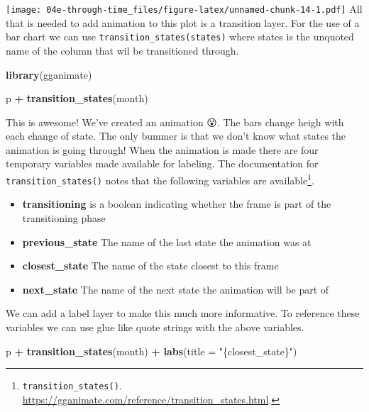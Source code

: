 \documentclass[
]{book}
\newenvironment{Shaded}{\begin{snugshade}}{\end{snugshade}}
\newcommand{\DataTypeTok}[1]{\textcolor[rgb]{0.13,0.29,0.53}{#1}}
\newcommand{\KeywordTok}[1]{\textcolor[rgb]{0.13,0.29,0.53}{\textbf{#1}}}
\newcommand{\NormalTok}[1]{#1}
\newcommand{\OperatorTok}[1]{\textcolor[rgb]{0.81,0.36,0.00}{\textbf{#1}}}
\newcommand{\StringTok}[1]{\textcolor[rgb]{0.31,0.60,0.02}{#1}}
\providecommand{\tightlist}{%
  \setlength{\itemsep}{0pt}\setlength{\parskip}{0pt}}
\begin{document}
\texttt{[image: 04e-through-time\_files/figure-latex/unnamed-chunk-14-1.pdf]}
All that is needed to add animation to this plot is a transition layer. For the use of a bar chart we can use \texttt{transition\_states(states)} where states is the unquoted name of the column that wil be transitioned through.

\begin{Shaded}
\begin{Highlighting}[]
\KeywordTok{library}\NormalTok{(gganimate)}

\NormalTok{p }\OperatorTok{+}\StringTok{ }\KeywordTok{transition\_states}\NormalTok{(month)  }
\end{Highlighting}
\end{Shaded}

This is awesome! We've created an animation 😮. The bars change heigh with each change of state. The only bummer is that we don't know what states the animation is going through! When the animation is made there are four temporary variables made available for labeling. The documentation for \texttt{transition\_states()} notes that the following variables are available\footnote{\texttt{transition\_states()}. \url{https://gganimate.com/reference/transition_states.html}.}.

\begin{itemize}
\tightlist
\item
  \textbf{transitioning} is a boolean indicating whether the frame is part of the transitioning phase
\item
  \textbf{previous\_state} The name of the last state the animation was at
\item
  \textbf{closest\_state} The name of the state closest to this frame
\item
  \textbf{next\_state} The name of the next state the animation will be part of
\end{itemize}

We can add a label layer to make this much more informative. To reference these variables we can use glue like quote strings with the above variables.

\begin{Shaded}
\begin{Highlighting}[]
\NormalTok{p }\OperatorTok{+}\StringTok{ }
\StringTok{  }\KeywordTok{transition\_states}\NormalTok{(month)  }\OperatorTok{+}
\StringTok{  }\KeywordTok{labs}\NormalTok{(}\DataTypeTok{title =} \StringTok{"\{closest\_state\}"}\NormalTok{)}
\end{Highlighting}
\end{Shaded}
\end{document}
